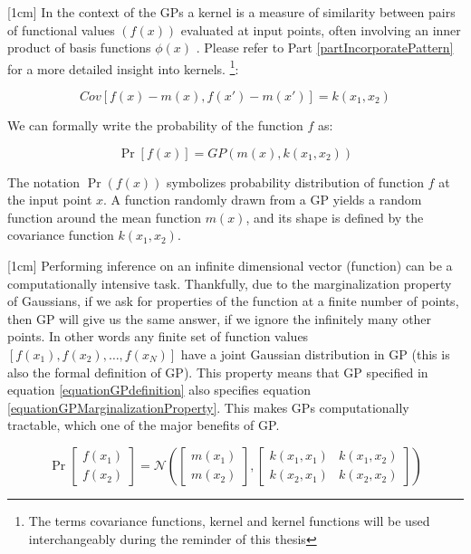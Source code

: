 [1cm]
In the context of the GPs a kernel is a measure of similarity between pairs of functional values $(f(x))$ evaluated at input points, often involving an inner product of basis functions $\phi(x)$ \cite{bishop2006pattern}. Please refer to Part \ref{partIncorporatePattern} for a more detailed insight into kernels.   \footnote{The terms covariance functions, kernel and kernel functions will be used interchangeably during the reminder of this thesis}:

\begin{equation}\label{eq:covarianceGP}
Cov[f(x) - m(x), f(x') - m(x')] = k(x_{1}, x_{2})
\end{equation}

We can formally write the probability of the function $f$ as:

\begin{equation}\label{equationGPdefinition}
\Pr[f(x)] = GP(m(x), k(x_{1}, x_{2}))
\end{equation}

The notation $\Pr(f( x))$ symbolizes probability distribution of function $f$ at the input point $x$. A function randomly drawn from a GP yields a random function around the mean function $m(x)$, and its shape is defined by the covariance function $k(x_{1}, x_{2})$. 

[1cm]
Performing inference on an infinite dimensional vector (function) can be a computationally intensive task. Thankfully, due to the marginalization property of Gaussians, if we ask for properties of the function at a finite number of points, then  GP will give us the same answer, if we ignore the infinitely many other points. In other words any finite set of function values $[f(x_{1}), f(x_{2}), \ldots, f(x_{N})]$ have a joint Gaussian distribution in GP (this is also the formal definition of GP). This property means that GP specified in equation \ref{equationGPdefinition} also specifies equation \ref{equationGPMarginalizationProperty}. This makes GPs computationally tractable, which one of the major benefits of GP. 

\begin{equation}\label{equationGPMarginalizationProperty}
\Pr\left [ \begin{matrix}
f(x_{1})
\\ f(x_{2})
\end{matrix} \right ] = \mathcal{N}\left (\left [ \begin{matrix}
m(x_{1})
\\ m(x_{2})

\end{matrix} \right ] , \left [ \begin{matrix}
k(x_{1}, x_{1}) & k(x_{1}, x_{2})\\ 
k(x_{2}, x_{1}) & k(x_{2}, x_{2})
\end{matrix} \right ] \right )
\end{equation}


